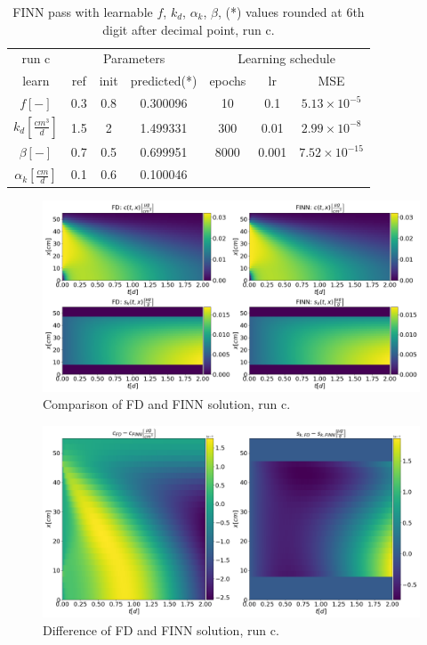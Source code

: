 \begin{table}[h!]
    \centering
    \begin{tabular}{c|ccc||cc|c}
    run c & \multicolumn{3}{c}{Parameters}& \multicolumn{3}{c}{Learning schedule}\\
          learn & ref & init & predicted(*) & epochs & lr & MSE \\[0.2 cm] \hline
         $f[-]$ & 0.3 & 0.8 & 0.300096 & 10 & 0.1 & $5.13 \times 10^{-5}$\\
         $k_d \left[\frac{cm^3}{d}\right]$ & 1.5 & 2 & 1.499331 & 300 & 0.01 & $2.99 \times 10^{-8}$\\
          $\beta \left[-\right]$ & 0.7 & 0.5 & 0.699951 & 8000 & 0.001 & $7.52 \times 10^{-15}$\\
         $\alpha_k \left[\frac{cm}{d}\right]$ & 0.1 & 0.6 & 0.100046 & & & \\
    \end{tabular}
    \caption[FINN pass with learnable $f$, $k_d$, $\alpha_k$, $\beta$, run c]{FINN pass with learnable $f$, $k_d$, $\alpha_k$, $\beta$, (*) values rounded at 6th digit after decimal point, run c.}
    \label{tab:learn_f_k_d_beta_alpha_k}
\end{table}
\begin{figure}[h!]
    \centering
    \includegraphics[width=\textwidth]{images/res_ov_synt_pparam.png}
    \caption[Comparison of FD and FINN solution, run c]{Comparison of FD and FINN solution, run c.}
    \label{fig:res_ov_synt_pparam}
\end{figure}
\begin{figure}[h!]
    \centering
    \includegraphics[width=\textwidth]{images/res_diff_synt_pparam.png}
    \caption[Difference of FD and FINN solution, run c]{Difference of FD and FINN solution, run c.}
    \label{fig:res_diff_synt_pparam}
\end{figure}
